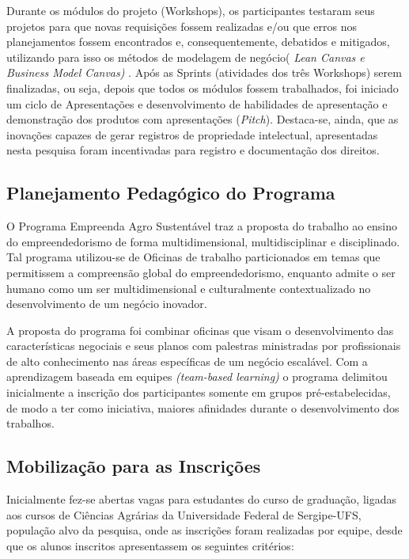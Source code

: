 Durante os módulos do projeto (Workshops), os participantes testaram seus projetos para que novas requisições fossem realizadas e/ou que erros nos planejamentos fossem encontrados e, consequentemente, debatidos e mitigados, utilizando para isso os métodos de modelagem de negócio( \textit{Lean Canvas e Business Model Canvas)} . Após as Sprints (atividades dos três Workshops) serem finalizadas, ou seja, depois que todos os módulos fossem trabalhados, foi iniciado um ciclo de Apresentações e desenvolvimento de habilidades de apresentação e demonstração dos produtos com apresentações (\textit{Pitch}). Destaca-se, ainda, que as inovações capazes de gerar registros de propriedade intelectual, apresentadas nesta pesquisa foram incentivadas para registro e documentação dos direitos.

\subsection{Planejamento Pedagógico do Programa}

O Programa Empreenda Agro Sustentável traz a proposta do trabalho ao ensino do empreendedorismo de forma multidimensional, multidisciplinar e disciplinado. Tal programa utilizou-se de Oficinas de trabalho particionados em temas que permitissem a compreensão global do empreendedorismo, enquanto admite o ser humano como um ser multidimensional e culturalmente contextualizado no desenvolvimento de um negócio inovador.

A proposta do programa foi combinar oficinas que visam o desenvolvimento das características negociais e seus planos com palestras ministradas por profissionais de alto conhecimento nas áreas específicas de um negócio escalável. Com a aprendizagem baseada em equipes \textit{(team-based learning)} o programa delimitou inicialmente a inscrição dos participantes somente em grupos pré-estabelecidas, de modo a ter como iniciativa, maiores afinidades durante o desenvolvimento dos trabalhos.


\subsection{Mobilização para as Inscrições}

Inicialmente fez-se abertas vagas para estudantes do curso de graduação, ligadas aos cursos de Ciências Agrárias da Universidade Federal de Sergipe-UFS, população alvo da pesquisa, onde as inscrições foram realizadas por equipe, desde que os alunos inscritos apresentassem os seguintes critérios:


